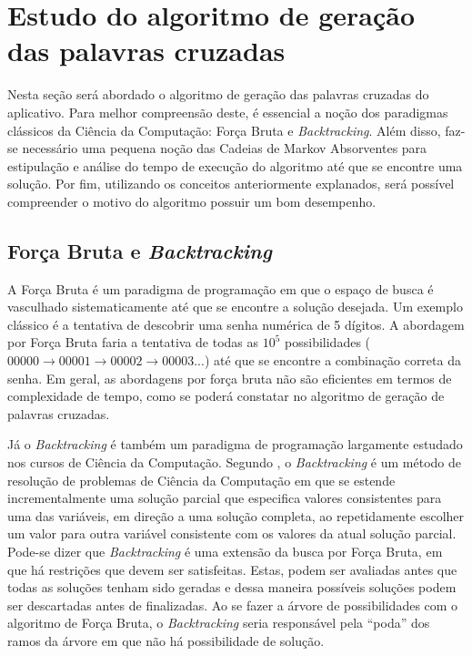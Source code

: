 \section{Estudo do algoritmo de geração das palavras cruzadas} 
Nesta seção será abordado o algoritmo de geração das palavras cruzadas do aplicativo. Para melhor compreensão deste, é essencial a noção dos paradigmas clássicos da Ciência da Computação: Força Bruta e \textit{Backtracking}. Além disso, faz-se necessário uma pequena noção das Cadeias de Markov Absorventes para estipulação e análise do tempo de execução do algoritmo até que se encontre uma solução. Por fim, utilizando os conceitos anteriormente explanados, será possível compreender o motivo do algoritmo possuir um bom desempenho.

\subsection{Força Bruta e \textit{Backtracking}}
A Força Bruta é um paradigma de programação em que o espaço de busca é vasculhado sistematicamente até que se encontre a solução desejada. Um exemplo clássico é a tentativa de descobrir uma senha numérica de 5 dígitos. A abordagem por Força Bruta faria a tentativa de todas as $10^{5}$ possibilidades ($00000 \rightarrow 00001 \rightarrow 00002 \rightarrow 00003$...) até que se encontre a combinação correta da senha. Em geral, as abordagens por força bruta não são eficientes em termos de complexidade de tempo, como se poderá constatar no algoritmo de geração de palavras cruzadas.

Já o \textit{Backtracking} é também um paradigma de programação largamente estudado nos cursos de Ciência da Computação. Segundo \cite{nilsson1980principles}, o \textit{Backtracking} é um método de resolução de problemas de Ciência da Computação em que se estende incrementalmente uma solução parcial que especifica valores consistentes para uma das variáveis, em direção a uma solução completa, ao repetidamente escolher um valor para outra variável consistente com os valores da atual solução parcial. Pode-se dizer que \textit{Backtracking} é uma extensão da busca por Força Bruta, em que há restrições que devem ser satisfeitas. Estas, podem ser avaliadas antes que todas as soluções tenham sido geradas e dessa maneira possíveis soluções podem ser descartadas antes de finalizadas. Ao se fazer a árvore de possibilidades com o algoritmo de Força Bruta, o \textit{Backtracking} seria responsável pela ``poda'' dos ramos da árvore em que não há possibilidade de solução.

